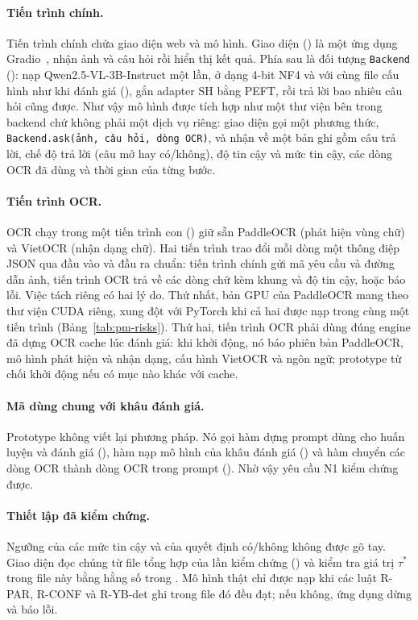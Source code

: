 \paragraph{Tiến trình chính.} Tiến trình chính chứa giao diện web và mô hình. Giao diện
() là một ứng dụng Gradio~\cite{abid2019gradio}, nhận ảnh và câu
hỏi rồi hiển thị kết quả. Phía sau là đối tượng \texttt{Backend}
(): nạp Qwen2.5-VL-3B-Instruct một lần, ở dạng 4-bit NF4 và với
cùng file cấu hình như khi đánh giá (), gắn adapter SH bằng
PEFT, rồi trả lời bao nhiêu câu hỏi cũng được. Như vậy mô hình được tích hợp như một thư
viện bên trong backend chứ không phải một dịch vụ riêng: giao diện gọi một phương thức,
\texttt{Backend.ask(ảnh, câu hỏi, dòng OCR)}, và nhận về một bản ghi gồm câu trả lời, chế
độ trả lời (câu mở hay có/không), độ tin cậy và mức tin cậy, các dòng OCR đã dùng và thời
gian của từng bước.

\paragraph{Tiến trình OCR.} OCR chạy trong một tiến trình con
() giữ sẵn PaddleOCR (phát hiện vùng chữ) và VietOCR
(nhận dạng chữ). Hai tiến trình trao đổi mỗi dòng một thông điệp JSON qua đầu vào và đầu
ra chuẩn: tiến trình chính gửi mã yêu cầu và đường dẫn ảnh, tiến trình OCR trả về các dòng
chữ kèm khung và độ tin cậy, hoặc báo lỗi. Việc tách riêng có hai lý do. Thứ nhất, bản GPU
của PaddleOCR mang theo thư viện CUDA riêng, xung đột với PyTorch khi cả hai được nạp trong
cùng một tiến trình (Bảng~\ref{tab:pm-risks}). Thứ hai, tiến trình OCR phải dùng đúng engine
đã dựng OCR cache lúc đánh giá: khi khởi động, nó báo phiên bản PaddleOCR, mô hình phát hiện
và nhận dạng, cấu hình VietOCR và ngôn ngữ; prototype từ chối khởi động nếu có mục nào khác
với cache.

\paragraph{Mã dùng chung với khâu đánh giá.} Prototype không viết lại phương pháp. Nó gọi
hàm dựng prompt dùng cho huấn luyện và đánh giá (), hàm nạp
mô hình của khâu đánh giá () và hàm chuyển các dòng OCR thành
dòng OCR trong prompt (). Nhờ vậy yêu cầu N1 kiểm chứng được.

\paragraph{Thiết lập đã kiểm chứng.} Ngưỡng của các mức tin cậy và của quyết định có/không
không được gõ tay. Giao diện đọc chúng từ file tổng hợp của lần kiểm chứng
() và kiểm tra
giá trị $\tau^*$ trong file này bằng hằng số trong . Mô hình thật chỉ được nạp
khi các luật R-PAR, R-CONF và R-YB-det ghi trong file đó đều đạt; nếu không, ứng dụng dừng
và báo lỗi.

